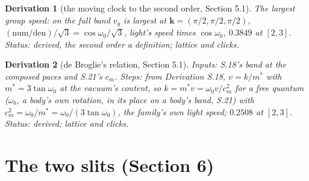 \documentclass[pdflatex,sn-mathphys-num]{sn-jnl}
\newcommand{\num}{\mathrm{num}}
\newcommand{\den}{\mathrm{den}}
\theoremstyle{thmstyleone}
\newtheorem{derivation}{Derivation}
\begin{document}
\begin{derivation}[the moving clock to the second order, Section 5.1]
 \emph{The largest group speed:} on the full band $v_g$ is largest at $\mathbf k = (\pi / 2, \pi / 2, \pi / 2)$, $(\num / \den) / \sqrt 3 = \cos\omega_0 / \sqrt 3$, light's speed times $\cos\omega_0$, $0.3849$ at $[2, 3]$.
 \emph{Status:} derived, the second order a definition; lattice and clicks.
\end{derivation}

\begin{derivation}[de Broglie's relation, Section 5.1]
\emph{Inputs:} S.18's band at the composed paces and S.21's $c_m$. \emph{Steps:} from Derivation S.18, $v = k / m^*$ with $m^* = 3\tan\omega_0$ at the vacuum's content, so $k = m^* v = \omega_0 v / c_m^2$ for a free quantum ($\omega_b$, a body's own rotation, in its place on a body's band, S.21) with $c_m^2 = \omega_0 / m^* = \omega_0 / (3\tan\omega_0)$, the family's own light speed; $0.2508$ at $[2, 3]$.
 \emph{Status:} derived; lattice and clicks.
\end{derivation}

\section*{The two slits (Section 6)}
\end{document}
